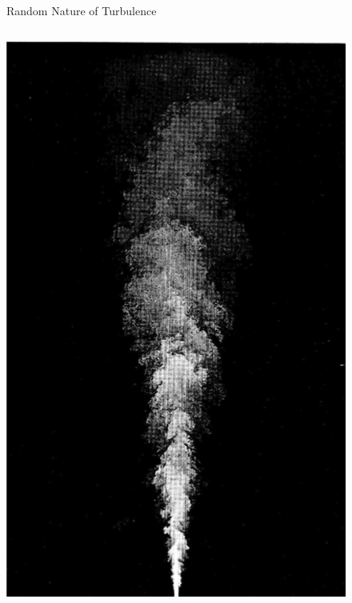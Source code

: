 \begin{frame}{Random Nature of Turbulence}
\setlength{\fboxsep}{0pt}
\setlength{\fboxrule}{1pt}
\begin{columns}[T]
    \begin{column}{.35\textwidth}
      \includegraphics[width=\textwidth]{jet.png}
    \end{column}
    \begin{column}{.65\textwidth}
    \begin{minipage}[c][.7\textheight][c]{\linewidth}

\end{minipage}
\end{column}
\end{columns}
\end{frame}
